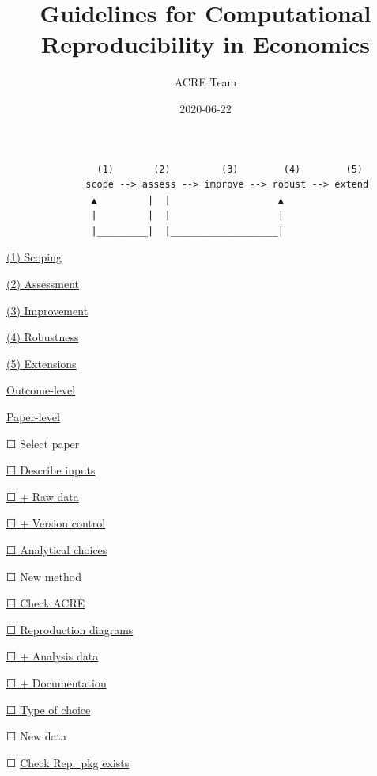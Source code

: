 \documentclass[]{book}
\title{Guidelines for Computational Reproducibility in Economics}
\author{ACRE Team}
\date{2020-06-22}
\begin{document}
\maketitle

{
\setcounter{tocdepth}{1}
\tableofcontents
}
\hypertarget{section}{%
\chapter*{}\label{section}}

\begin{verbatim}
                (1)       (2)         (3)        (4)        (5)
              scope --> assess --> improve --> robust --> extend
               ▲         |  |                   ▲
               |         |  |                   |
               |_________|  |___________________|
\end{verbatim}

\protect\hyperlink{scoping}{(1) Scoping}

\protect\hyperlink{assessment}{(2) Assessment}

\protect\hyperlink{improvements}{(3) Improvement}

\protect\hyperlink{robust}{(4) Robustness}

\href{}{(5) Extensions}

\protect\hyperlink{improvements}{Outcome-level}

\protect\hyperlink{paper-level}{Paper-level}

☐ Select paper

\protect\hyperlink{describe-inputs}{☐ Describe inputs}

\protect\hyperlink{rd}{☐ + Raw data}

\protect\hyperlink{paper-level}{☐ + Version control}

\protect\hyperlink{id-analy}{☐ Analytical choices}

☐ New method

\protect\hyperlink{check-acre}{☐ Check ACRE}

\protect\hyperlink{diagram}{☐ Reproduction diagrams}

\protect\hyperlink{ad}{☐ + Analysis data}

\protect\hyperlink{paper-level}{☐ + Documentation}

\protect\hyperlink{id-type}{☐ Type of choice}

☐ New data

☐ \protect\hyperlink{verify-rep-mat}{Check Rep.~pkg exists}
\end{document}
